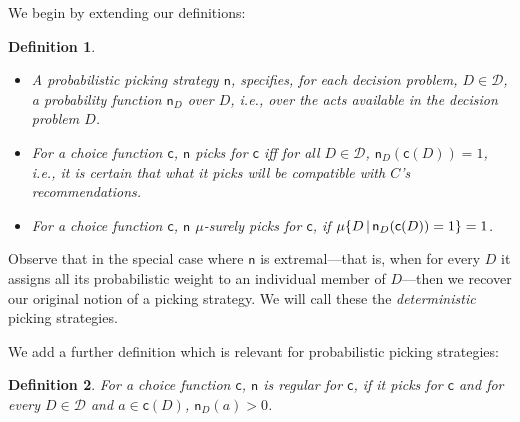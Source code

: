 \documentclass[a4paper]{article}
\newtheorem{definition}{Definition}
\newcommand\A{\mathcal{A}}
\renewcommand\P{\mathbb{P}} %
\newcommand\EU{\mathrm{EU}}
\newcommand\REU{\mathrm{REU}}
\newcommand\EAd{\mathrm{EAd}}
\newcommand\Maximin{\Gamma}
\newcommand{\D}{\mathcal{D}}
\newcommand\s{\mathsf{s}}
\renewcommand\c{\mathsf{c}} %
\newcommand{\n}{\mathsf{n}}
\newcommand{\IP}{\P}
\newcommand{\todoold}[2][]{\todo[backgroundcolor=white,bordercolor=orange!10,linecolor=gray!10, #1,caption={},textcolor=gray]{Pre-rev: #2}}
\newcommand{\todooldinfo}[2][]{\todoold[#1]{#2}}
\renewcommand{\color}[1]{}
\newcommand\SetDelimiter[1][]{
	\nonscript\,#1\vert \allowbreak \nonscript\,\mathopen{}}
\providecommand\given{\SetDelimiter}
\renewcommand{\emptyset}{\varnothing}
\newenvironment{CCM rewritten}
{\begingroup\color{blue}} %
{\endgroup}              %
\begin{document}
We begin by extending our definitions:
\begin{definition}\label{def:nu stuff}\ 
	\begin{itemize}
		\item %
		A \emph{probabilistic picking strategy} $\n$, specifies, for each decision problem, $D\in\D$, a probability function $\n_D$ over $D$, i.e., over the acts available in the decision problem $D$.
		\item For a choice function $\c$,  $\n$ \emph{picks for $\c$} iff for all $D\in\D$,  $\n_D(\c(D))=1$, i.e., it is certain that what it picks will be compatible with $C$'s recommendations.
		\item For a choice function $\c$, $\n$ \emph{$\mu$-surely picks for $\c$}, if $\mu\{D\given \n_D(\c(D))=1\}=1$.
 	\end{itemize}
\end{definition}
Observe that in the special case where $\n$ is extremal---that is, when for every $D$ it assigns all its probabilistic weight to an individual member of $D$---then we recover our original notion of a picking strategy. We will call these the \emph{deterministic} picking strategies. 

We add a further definition which is relevant for probabilistic picking strategies: 
\begin{definition}
For a choice function $\c$,  \emph{$\n$ is regular for $\c$}, if it picks for $\c$ and for every $D\in\D$ and $a\in\c(D)$, $\n_D(a)>0$. %
\end{definition}


\end{document}
